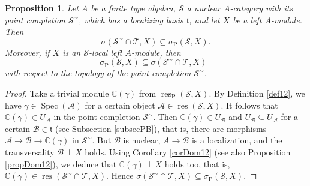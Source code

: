 \documentclass[12pt]{amsart}%
\theoremstyle{plain}
\newtheorem{proposition}{Proposition}
\numberwithin{equation}{section}
\numberwithin{equation}{section}
\numberwithin{theorem}{section}
\numberwithin{lemma}{section}
\numberwithin{remark}{section}
\numberwithin{example}{section}
\numberwithin{proposition}{section}
\numberwithin{definition}{section}
\numberwithin{corollary}{section}
\begin{document}
\begin{proposition}
\label{propLocG}Let $A$ be a finite type algebra, $\mathcal{S}$ a nuclear
$A$-category with its point completion $\mathcal{S}^{\sim}$, which has a
localizing basis $\mathfrak{t}$, and let $X$ be a \textit{left }%
$A$\textit{-module. }Then
\[
\sigma\left(  \mathcal{S}^{\sim}\cap\mathcal{T},X\right)  \subseteq
\sigma_{\operatorname{P}}\left(  \mathcal{S},X\right)  .
\]
Moreover, if $X$ is an $\mathcal{S}$\textit{-local left }$A$\textit{-module,
then }%
\[
\sigma_{\operatorname{P}}\left(  \mathcal{S},X\right)  \subseteq\sigma\left(
\mathcal{S}^{\sim}\cap\mathcal{T},X\right)  ^{-}%
\]
with respect to the topology of the point completion $\mathcal{S}^{\sim}$.
\end{proposition}

\begin{proof}
Take a trivial module $\mathbb{C}\left(  \gamma\right)  $ from
$\operatorname{res}_{\operatorname{P}}\left(  \mathcal{S},X\right)  $. By
Definition \ref{def12}, we have $\gamma\in\operatorname{Spec}\left(
\mathcal{A}\right)  $ for a certain object $\mathcal{A}\in\operatorname{res}%
\left(  \mathcal{S},X\right)  $. It follows that $\mathbb{C}\left(
\gamma\right)  \in U_{\mathcal{A}}$ in the point completion $\mathcal{S}%
^{\sim}$. Then $\mathbb{C}\left(  \gamma\right)  \in U_{\mathcal{B}}$ and
$U_{\mathcal{B}}\subseteq U_{\mathcal{A}}$ for a certain $\mathcal{B}%
\in\mathfrak{t}$ (see Subsection \ref{subsecPB}), that is, there are morphisms
$\mathcal{A\rightarrow B}\rightarrow\mathbb{C}\left(  \gamma\right)  $ in
$\mathcal{S}^{\sim}$. But $\mathcal{B}$ is nuclear, $A\rightarrow\mathcal{B}$
is a localization, and the transversality $\mathcal{B}\perp X$ holds. Using
Corollary \ref{corDom12} (see also Proposition \ref{propDom12}), we deduce
that $\mathbb{C}\left(  \gamma\right)  \perp X$ holds too, that is,
$\mathbb{C}\left(  \gamma\right)  \in\operatorname{res}\left(  \mathcal{S}%
^{\sim}\cap\mathcal{T},X\right)  $. Hence $\sigma\left(  \mathcal{S}^{\sim
}\cap\mathcal{T},X\right)  \subseteq\sigma_{\operatorname{P}}\left(
\mathcal{S},X\right)  $.


\end{proof}
\end{document}
